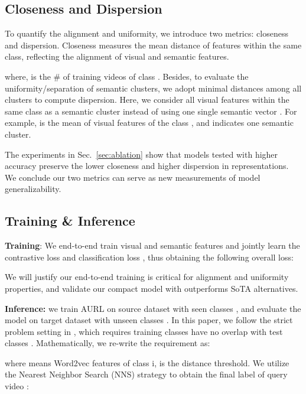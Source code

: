 \documentclass[10pt,twocolumn,letterpaper]{article}
\begin{document}
\subsection{Closeness and Dispersion}
To quantify the alignment and uniformity, we introduce two metrics: closeness and dispersion. 
Closeness measures the mean distance of features within the same class, reflecting the alignment of visual and semantic features.

where,  is the \# of training videos of class .
Besides, to evaluate the uniformity/separation of semantic clusters, we adopt minimal distances among all clusters to compute dispersion.
Here, we consider all visual features within the same class as a semantic cluster instead of using one single semantic vector .
For example,  is the mean of visual features of the class , and indicates one semantic cluster.

The experiments in Sec.~\ref{sec:ablation} show that models tested with higher accuracy preserve the lower closeness and higher dispersion in representations.
We conclude our two metrics can serve as new measurements of model generalizability.

\subsection{Training \& Inference}
{\bf Training}:
We end-to-end train visual and semantic features and jointly learn the contrastive loss  and classification loss , thus obtaining the following overall loss:

We will justify our end-to-end training is critical for alignment and uniformity properties, and validate our compact model with  outperforms SoTA alternatives.

{\bf Inference:} we train AURL on source dataset  with  seen classes , and evaluate the model on target dataset  with  unseen classes .
In this paper, we follow the strict problem setting in \cite{brattoli2020rethinking}, which requires training classes  have no overlap with test classes .
Mathematically, we re-write the requirement as:

where  means Word2vec features of class i,  is the distance threshold.
We utilize the Nearest Neighbor Search (NNS) strategy to obtain the final label of query video :
\end{document}
